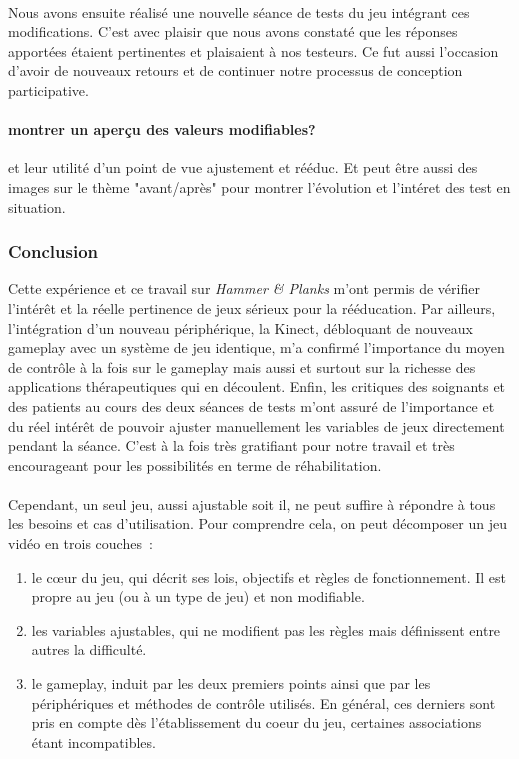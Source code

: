 		
	\paragraph{} Nous avons ensuite réalisé une nouvelle séance de tests du jeu intégrant ces modifications. C'est avec plaisir que nous avons constaté que les réponses apportées étaient pertinentes et plaisaient à nos testeurs. Ce fut aussi l'occasion d'avoir de nouveaux retours et de continuer notre processus de conception participative.
	
\paragraph{montrer un aperçu des valeurs modifiables?} et leur utilité d'un point de vue
ajustement et rééduc. Et peut être aussi des images sur le thème "avant/après" pour montrer l'évolution et l'intéret des test en situation.

	\subsubsection*{Conclusion}
	Cette expérience et ce travail sur \emph{Hammer \& Planks} m'ont permis de vérifier l'intérêt et la réelle pertinence de jeux sérieux pour la rééducation. Par ailleurs, l'intégration d'un nouveau périphérique, la Kinect, débloquant de nouveaux gameplay avec un système de jeu identique, m'a confirmé l'importance du moyen de contrôle à la fois sur le gameplay mais aussi et surtout sur la richesse des applications thérapeutiques qui en découlent. Enfin, les critiques des soignants et des patients au cours des deux séances de tests m'ont assuré de l'importance et du réel intérêt de pouvoir ajuster manuellement les variables de jeux directement pendant la séance. C'est à la fois très gratifiant pour notre travail et très encourageant pour les possibilités en terme de réhabilitation.
	
\paragraph{}
Cependant, un seul jeu, aussi ajustable soit il, ne peut suffire à répondre à tous les besoins et cas d'utilisation. Pour comprendre cela, on peut décomposer un jeu vidéo en trois couches~:
\begin{enumerate}
	\item le cœur du jeu, qui décrit ses lois, objectifs et règles de fonctionnement. Il est propre au jeu (ou à un type de jeu) et non modifiable.
	\item les variables ajustables, qui ne modifient pas les règles mais définissent entre autres la difficulté.
	\item le gameplay, induit par les deux premiers points ainsi que par les périphériques et méthodes de contrôle utilisés. En général, ces derniers sont pris en compte dès l'établissement du coeur du jeu, certaines associations étant incompatibles.
\end{enumerate}

